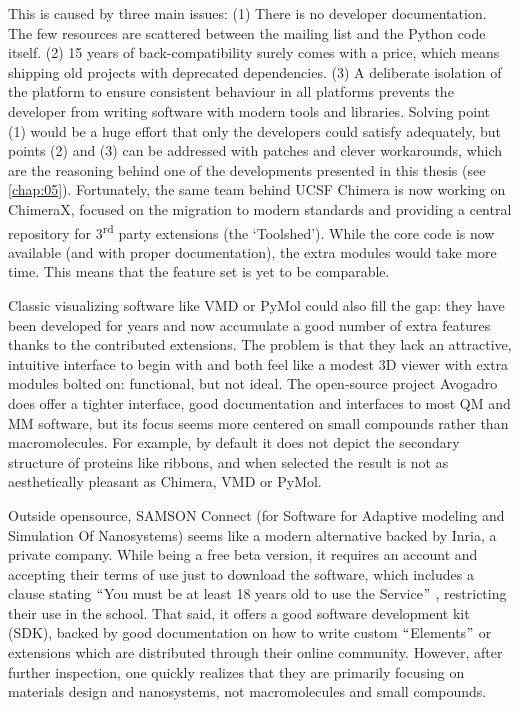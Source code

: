 This is caused by three main issues: (1) There is no developer documentation. The few resources are scattered between the mailing list and the Python code itself. (2) 15 years of back-compatibility surely comes with a price, which means shipping old projects with deprecated dependencies. (3) A deliberate isolation of the platform to ensure consistent behaviour in all platforms prevents the developer from writing software with modern tools and libraries. Solving point (1) would be a huge effort that only the developers could satisfy adequately, but points (2) and (3) can be addressed with patches and clever workarounds, which are the reasoning behind one of the developments presented in this thesis (see \autoref{chap:05}). Fortunately, the same team behind UCSF Chimera is now working on ChimeraX, focused on the migration to modern standards and providing a central repository for 3\textsuperscript{rd} party extensions (the ‘Toolshed’). While the core code is now available (and with proper documentation), the extra modules would take more time. This means that the feature set is yet to be comparable.

Classic visualizing software like VMD or PyMol could also fill the gap: they have been developed for years and now accumulate a good number of extra features thanks to the contributed extensions. The problem is that they lack an attractive, intuitive interface to begin with and both feel like a modest 3D viewer with extra modules bolted on: functional, but not ideal. The open-source project Avogadro does offer a tighter interface, good documentation and interfaces to most QM and MM software, but its focus seems more centered on small compounds rather than macromolecules. For example, by default it does not depict the secondary structure of proteins like ribbons, and when selected the result is not as aesthetically pleasant as Chimera, VMD or PyMol.

Outside opensource, SAMSON Connect (for Software for Adaptive modeling and Simulation Of Nanosystems) seems like a modern alternative backed by Inria, a private company. While being a free beta version, it requires an account and accepting their terms of use just to download the software, which includes a clause stating $``$You must be at least 18 years old to use the Service$"$ , restricting their use in the school. That said, it offers a good software development kit (SDK), backed by good documentation on how to write custom $``$Elements$"$  or extensions which are distributed through their online community. However, after further inspection, one quickly realizes that they are primarily focusing on materials design and nanosystems, not macromolecules and small compounds.

